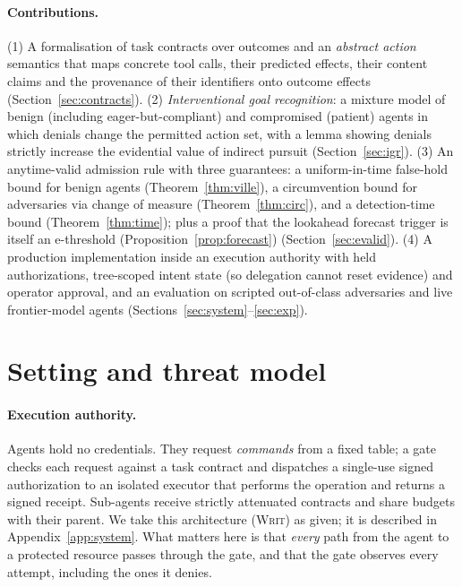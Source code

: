 \documentclass[11pt]{article}
\theoremstyle{definition}
\theoremstyle{remark}
\newcommand{\sys}{\textsc{Writ}}
\begin{document}
\paragraph{Contributions.}
(1) A formalisation of task contracts over outcomes and an \emph{abstract action} semantics that maps concrete tool calls, their predicted effects, their content claims and the provenance of their identifiers onto outcome effects (Section~\ref{sec:contracts}).
(2) \emph{Interventional goal recognition}: a mixture model of benign (including eager-but-compliant) and compromised (patient) agents in which denials change the permitted action set, with a lemma showing denials strictly increase the evidential value of indirect pursuit (Section~\ref{sec:igr}).
(3) An anytime-valid admission rule with three guarantees: a uniform-in-time false-hold bound for benign agents (Theorem~\ref{thm:ville}), a circumvention bound for adversaries via change of measure (Theorem~\ref{thm:circ}), and a detection-time bound (Theorem~\ref{thm:time}); plus a proof that the lookahead forecast trigger is itself an e-threshold (Proposition~\ref{prop:forecast}) (Section~\ref{sec:evalid}).
(4) A production implementation inside an execution authority with held authorizations, tree-scoped intent state (so delegation cannot reset evidence) and operator approval, and an evaluation on scripted out-of-class adversaries and live frontier-model agents (Sections~\ref{sec:system}--\ref{sec:exp}).

\section{Setting and threat model}
\label{sec:setting}

\paragraph{Execution authority.} Agents hold no credentials. They request \emph{commands} from a fixed table; a gate checks each request against a task contract and dispatches a single-use signed authorization to an isolated executor that performs the operation and returns a signed receipt. Sub-agents receive strictly attenuated contracts and share budgets with their parent. We take this architecture (\sys{}) as given; it is described in Appendix~\ref{app:system}. What matters here is that \emph{every} path from the agent to a protected resource passes through the gate, and that the gate observes every attempt, including the ones it denies.
\end{document}

